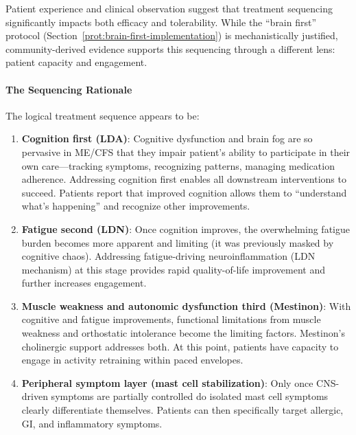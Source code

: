 \begin{observation}
\label{obs:treatment-sequencing-patient-capacity}

Patient experience and clinical observation suggest that treatment sequencing significantly impacts both efficacy and tolerability. While the ``brain first'' protocol (Section~\ref{prot:brain-first-implementation}) is mechanistically justified, community-derived evidence supports this sequencing through a different lens: patient capacity and engagement.

\paragraph{The Sequencing Rationale}

The logical treatment sequence appears to be:

\begin{enumerate}
    \item \textbf{Cognition first (LDA)}: Cognitive dysfunction and brain fog are so pervasive in ME/CFS that they impair patient's ability to participate in their own care---tracking symptoms, recognizing patterns, managing medication adherence. Addressing cognition first enables all downstream interventions to succeed. Patients report that improved cognition allows them to ``understand what's happening'' and recognize other improvements.

    \item \textbf{Fatigue second (LDN)}: Once cognition improves, the overwhelming fatigue burden becomes more apparent and limiting (it was previously masked by cognitive chaos). Addressing fatigue-driving neuroinflammation (LDN mechanism) at this stage provides rapid quality-of-life improvement and further increases engagement.

    \item \textbf{Muscle weakness and autonomic dysfunction third (Mestinon)}: With cognitive and fatigue improvements, functional limitations from muscle weakness and orthostatic intolerance become the limiting factors. Mestinon's cholinergic support addresses both. At this point, patients have capacity to engage in activity retraining within paced envelopes.

    \item \textbf{Peripheral symptom layer (mast cell stabilization)}: Only once CNS-driven symptoms are partially controlled do isolated mast cell symptoms clearly differentiate themselves. Patients can then specifically target allergic, GI, and inflammatory symptoms.
\end{enumerate}


\end{observation}
